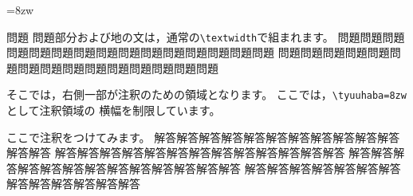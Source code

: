 \tyuuhaba=8zw\relax
\begin{itembox}{問題}
問題部分および地の文は，通常の\verb+\textwidth+で組まれます。
問題問題問題問題問題問題問題問題問題問題問題問題問題問題問題
問題問題問題問題問題問題問題問題問題問題問題問題問題問題問題
\end{itembox}
\begin{tyuukai}
そこでは，右側一部が注釈のための領域となります。
ここでは，\verb+\tyuuhaba=8zw+として注釈領域の
横幅を制限しています。

ここで注釈をつけてみます。
解答解答解答解答解答解答解答解答解答解答解答解答解答
解答解答解答解答解答解答解答解答解答解答解答解答解答
解答解答解答解答解答解答解答解答解答解答解答解答解答
解答解答解答解答解答解答解答解答解答解答解答解答解答
\end{tyuukai}
